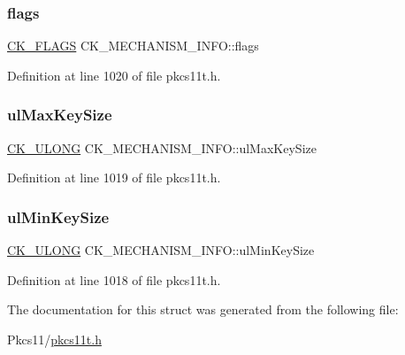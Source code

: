 \subsubsection{\texorpdfstring{flags}{flags}}
{\footnotesize\ttfamily \hyperlink{pkcs11t_8h_a53850492c1ba57aca4332be791a3c6a3}{C\+K\+\_\+\+F\+L\+A\+GS} C\+K\+\_\+\+M\+E\+C\+H\+A\+N\+I\+S\+M\+\_\+\+I\+N\+F\+O\+::flags}



Definition at line 1020 of file pkcs11t.\+h.

\mbox{\label{struct_c_k___m_e_c_h_a_n_i_s_m___i_n_f_o_ab5833180294f1a83f91a5ed8ccda92d6}} 
\subsubsection{\texorpdfstring{ul\+Max\+Key\+Size}{ulMaxKeySize}}
{\footnotesize\ttfamily \hyperlink{pkcs11t_8h_a35181858a3b7a0a81f49d180d8f446ef}{C\+K\+\_\+\+U\+L\+O\+NG} C\+K\+\_\+\+M\+E\+C\+H\+A\+N\+I\+S\+M\+\_\+\+I\+N\+F\+O\+::ul\+Max\+Key\+Size}



Definition at line 1019 of file pkcs11t.\+h.

\mbox{\label{struct_c_k___m_e_c_h_a_n_i_s_m___i_n_f_o_a4cfb88703adbce245090f1761cf155c3}} 
\subsubsection{\texorpdfstring{ul\+Min\+Key\+Size}{ulMinKeySize}}
{\footnotesize\ttfamily \hyperlink{pkcs11t_8h_a35181858a3b7a0a81f49d180d8f446ef}{C\+K\+\_\+\+U\+L\+O\+NG} C\+K\+\_\+\+M\+E\+C\+H\+A\+N\+I\+S\+M\+\_\+\+I\+N\+F\+O\+::ul\+Min\+Key\+Size}



Definition at line 1018 of file pkcs11t.\+h.



The documentation for this struct was generated from the following file\+:\begin{DoxyCompactItemize}
\item 
Pkcs11/\hyperlink{pkcs11t_8h}{pkcs11t.\+h}\end{DoxyCompactItemize}
